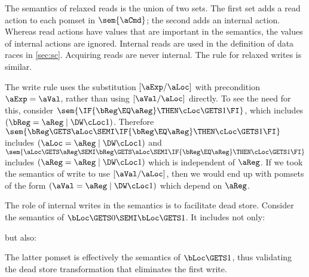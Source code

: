 
The semantics of relaxed reads is the union of two sets.  The first set adds
a read action to each pomset in $\sem{\aCmd}$; the second adds an internal
action.  Whereas read actions have values that are important in the
semantics, the values of internal actions are ignored.  Internal reads are used in the definition of data races in \textsection\ref{sec:sc}.
Acquiring reads are never internal.
The rule for relaxed writes is similar.

The write rule uses the substitution $[\aExp/\aLoc]$ with
precondition $\aExp=\aVal$, rather than using $[\aVal/\aLoc]$ directly.
To see the need for this, consider
$\sem{\IF{\bReg\EQ\aReg}\THEN \cLoc\GETS 1\FI}$,
which includes
\begin{math}
(\bReg=\aReg \mid \DW\cLoc1)
\end{math}.
Therefore
$\sem{\bReg\GETS\aLoc\SEMI\IF{\bReg\EQ\aReg}\THEN \cLoc\GETS 1\FI}$
includes
\begin{math}
  (\aLoc=\aReg \mid \DW\cLoc1)
\end{math}
and
$\sem{\aLoc\GETS\aReg\SEMI\bReg\GETS\aLoc\SEMI\IF{\bReg\EQ\aReg}\THEN \cLoc\GETS 1\FI}$
includes
\begin{math}
  (\aReg=\aReg \mid \DW\cLoc1)
\end{math}
which is independent of $\aReg$.
%
If we took the semantics of write to use $[\aVal/\aLoc]$, then we would end
up with pomsets of the form
\begin{math}
  (\aVal=\aReg \mid \DW\cLoc1)
\end{math}
which depend on $\aReg$.

The role of internal writes in the semantics is to facilitate dead store.  Consider the semantics of $\bLoc\GETS0 \SEMI \bLoc\GETS1$.  It includes not only:
\begin{tikzdisplay}
\end{tikzdisplay}
but also:
\begin{tikzdisplay}
\end{tikzdisplay}
The latter pomset is effectively the semantics of $\bLoc\GETS1$, thus validating the dead store transformation that eliminates the first write.  
 
